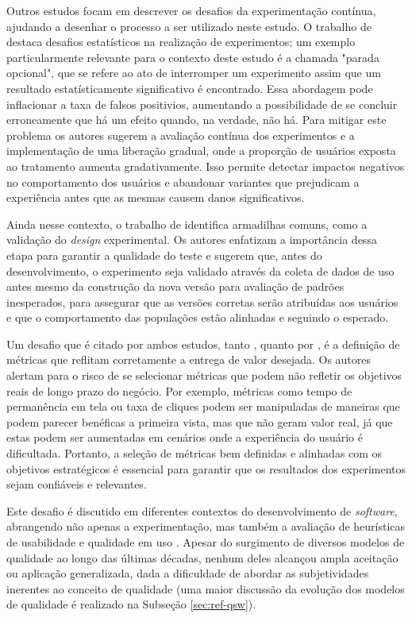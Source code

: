 Outros estudos focam em descrever os desafios da experimentação contínua, ajudando a desenhar o processo a ser utilizado neste estudo. O trabalho de  destaca desafios estatísticos na realização de experimentos; um exemplo particularmente relevante para o contexto deste estudo é a chamada "parada opcional", que se refere ao ato de interromper um experimento assim que um resultado estatísticamente significativo é encontrado. Essa abordagem pode inflacionar a taxa de falsos positivios, aumentando a possibilidade de se concluir erroneamente que há um efeito quando, na verdade, não há. Para mitigar este problema os autores sugerem a avaliação contínua dos experimentos e a implementação de uma liberação gradual, onde a proporção de usuários exposta ao tratamento aumenta gradativamente. Isso permite detectar impactos negativos no comportamento dos usuários e abandonar variantes que prejudicam a experiência antes que as mesmas causem danos significativos.

Ainda nesse contexto, o trabalho de  identifica armadilhas comuns, como a validação do \textit{design} experimental. Os autores enfatizam a importância dessa etapa para garantir a qualidade do teste e sugerem que, antes do desenvolvimento, o experimento seja validado através da coleta de dados de uso antes mesmo da construção da nova versão para avaliação de padrões inesperados, para assegurar que as versões corretas serão atribuídas aos usuários e que o comportamento das populações estão alinhadas e seguindo o esperado.

Um desafio que é citado por ambos estudos, tanto , quanto por , é a definição de métricas que reflitam corretamente a entrega de valor desejada. Os autores alertam para o risco de se selecionar métricas que podem não refletir os objetivos reais de longo prazo do negócio. Por exemplo, métricas como tempo de permanência em tela ou taxa de cliques podem ser manipuladas de maneiras que podem parecer benéficas a primeira vista, mas que não geram valor real, já que estas podem ser aumentadas em cenários onde a experiência do usuário é dificultada. Portanto, a seleção de métricas bem definidas e alinhadas com os objetivos estratégicos é essencial para garantir que os resultados dos experimentos sejam confiáveis e relevantes.

Este desafio é discutido em diferentes contextos do desenvolvimento de \textit{software}, abrangendo não apenas a experimentação, mas também a avaliação de heurísticas de usabilidade e qualidade em uso \cite{qatch} \cite{towards_sarmiento2024}. Apesar do surgimento de diversos modelos de qualidade ao longo das últimas décadas, nenhum deles alcançou ampla aceitação ou aplicação generalizada, dada a dificuldade de abordar as subjetividades inerentes ao conceito de qualidade \cite{qatch} (uma maior discussão da evolução dos modelos de qualidade é realizado na Subseção \ref{sec:ref-qsw}). 

